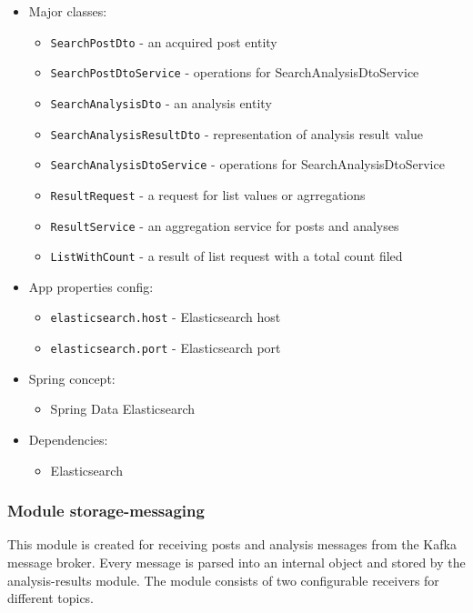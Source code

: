 \begin{itemize}
    \item Major classes:
        \begin{itemize}
            \item \texttt{SearchPostDto} - an acquired post entity
            \item \texttt{SearchPostDtoService} - operations for SearchAnalysisDtoService
            \item \texttt{SearchAnalysisDto} - an analysis entity 
            \item \texttt{SearchAnalysisResultDto} - representation of analysis result value
            \item \texttt{SearchAnalysisDtoService} - operations for SearchAnalysisDtoService
            \item \texttt{ResultRequest} - a request for list values or agrregations
            \item \texttt{ResultService} - an aggregation service for posts and analyses
            \item \texttt{ListWithCount} - a result of list request with a total count filed
        \end{itemize}
    \item App properties config:
        \begin{itemize}
            \item \texttt{elasticsearch.host} - Elasticsearch host
            \item \texttt{elasticsearch.port} - Elasticsearch port
        \end{itemize}
    \item Spring concept:
        \begin{itemize}
            \item Spring Data Elasticsearch
        \end{itemize}
    \item Dependencies:
        \begin{itemize}
            \item Elasticsearch
        \end{itemize}
\end{itemize}

\subsubsection{Module storage-messaging}

This module is created for receiving posts and analysis messages from the Kafka message broker. Every message is parsed into an internal object and stored by the analysis-results module. The module consists of two configurable receivers for different topics.

